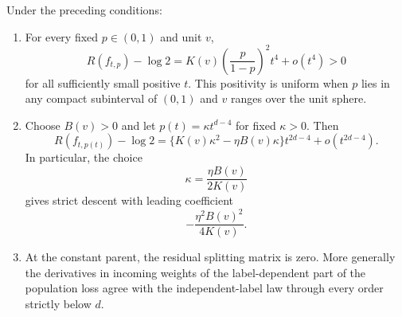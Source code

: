 \begin{theorem}\label{thm:boundary}
Under the preceding conditions:
\begin{enumerate}[label=(\roman*)]
\item For every fixed $p\in(0,1)$ and unit $v$,
\[
 R(f_{t,p})-\log2
   =K(v)\left(\frac{p}{1-p}\right)^2t^4+o(t^4)>0
\]
for all sufficiently small positive $t$. This positivity is uniform when
$p$ lies in any compact subinterval of $(0,1)$ and $v$ ranges over the unit sphere.
\item Choose $B(v)>0$ and let $p(t)=\kappa t^{d-4}$ for fixed $\kappa>0$.
Then
\begin{equation}\label{eq:jointlimit}
 R(f_{t,p(t)})-\log2
 =\{K(v)\kappa^2-\eta B(v)\kappa\}t^{2d-4}
    +o(t^{2d-4}).
\end{equation}
In particular, the choice
\[\kappa=\frac{\eta B(v)}{2K(v)}\]
gives strict descent with leading coefficient
\[ -\frac{\eta^2B(v)^2}{4K(v)}.\]
\item At the constant parent, the residual splitting matrix is zero.
More generally the derivatives in incoming weights of the label-dependent
part of the population loss agree with the independent-label law through
every order strictly below $d$.
\end{enumerate}
\end{theorem}

